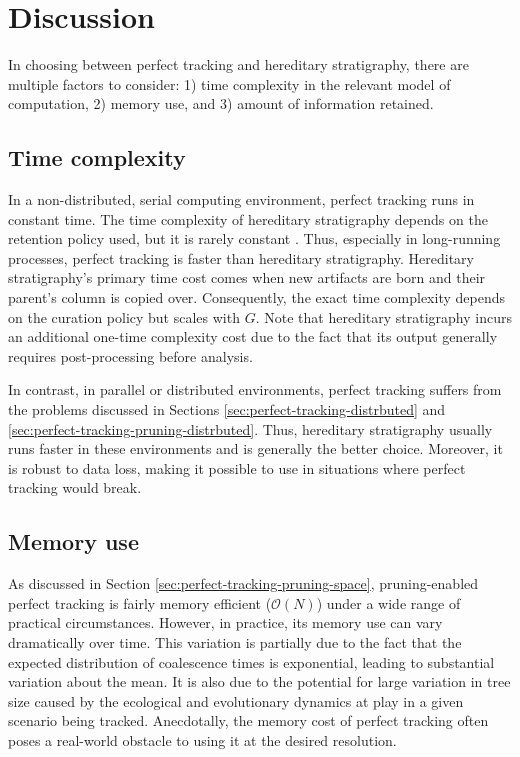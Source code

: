 \section{Discussion} \label{sec:discussion}

In choosing between perfect tracking and hereditary stratigraphy, there are multiple factors to consider: 1) time complexity in the relevant model of computation, 2) memory use, and 3) amount of information retained.

\subsection{Time complexity}

In a non-distributed, serial computing environment, perfect tracking runs in constant time.
The time complexity of hereditary stratigraphy depends on the retention policy used, but it is rarely constant \citep{OTHERPREPRINT}. %
Thus, especially in long-running processes, perfect tracking is faster than hereditary stratigraphy.
Hereditary stratigraphy's primary time cost comes when new artifacts are born and their parent's column is copied over.
Consequently, the exact time complexity depends on the curation policy but scales with $G$.
Note that hereditary stratigraphy incurs an additional one-time complexity cost due to the fact that its output generally requires post-processing before analysis.

In contrast, in parallel or distributed environments, perfect tracking suffers from the problems discussed in Sections \ref{sec:perfect-tracking-distrbuted} and \ref{sec:perfect-tracking-pruning-distrbuted}.
Thus, hereditary stratigraphy usually runs faster in these environments and is generally the better choice.
Moreover, it is robust to data loss, making it possible to use in situations where perfect tracking would break.

\subsection{Memory use}

As discussed in Section \ref{sec:perfect-tracking-pruning-space}, pruning-enabled perfect tracking is fairly memory efficient ($\mathcal{O}(N)$) under a wide range of practical circumstances.
However, in practice, its memory use can vary dramatically over time.
This variation is partially due to the fact that the expected distribution of coalescence times is exponential, leading to substantial variation about the mean.
It is also due to the potential for large variation in tree size caused by the ecological and evolutionary dynamics at play in a given scenario being tracked.
Anecdotally, the memory cost of perfect tracking often poses a real-world obstacle to using it at the desired resolution.

